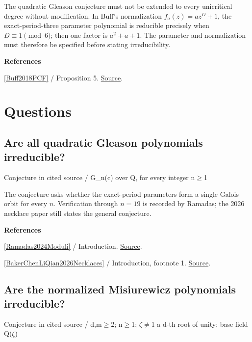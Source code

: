 \documentclass[11pt,a4paper,oneside,openany]{book}
\newenvironment{sources}{\par\smallskip\begingroup\footnotesize\color{atlasgray}\leftskip=10pt\setlength{\parskip}{2pt}}{\par\endgroup\smallskip}
\begin{document}
\color{black} The quadratic Gleason conjecture must not be extended to every unicritical degree without modification. In Buff's normalization \(f_a(z)=az^D+1\), the exact-period-three parameter polynomial is reducible precisely when \(D\equiv1\pmod6\); then one factor is \(a^2+a+1\). The parameter and normalization must therefore be specified before stating irreducibility.\par
\begin{sources}
\textbf{References}\par\smallskip
\noindent\hyperlink{ref:Buff2018PCF}{[Buff2018PCF]} / Proposition 5.  \href{https://nyjm.albany.edu/j/2018/24-54.html}{Source}.\par
\end{sources}\color{black}
\section*{Questions}
\subsection*{Are all quadratic Gleason polynomials irreducible?}
{\small\sffamily\color{atlasgold}Conjecture in cited source / G\_\allowbreak{}n(c) over Q, for every integer n\ensuremath{\ge}1}\par\smallskip
\color{black} The conjecture asks whether the exact-period parameters form a single Galois orbit for every \(n\). Verification through \(n=19\) is recorded by Ramadas; the 2026 necklace paper still states the general conjecture.\par
\begin{sources}
\textbf{References}\par\smallskip
\noindent\hyperlink{ref:Ramadas2024Moduli}{[Ramadas2024Moduli]} / Introduction.  \href{https://doi.org/10.1093/imrn/rnae126}{Source}.\par
\noindent\hyperlink{ref:BakerChenLiQian2026Necklaces}{[BakerChenLiQian2026Necklaces]} / Introduction, footnote 1.  \href{https://doi.org/10.1016/j.ejc.2026.104352}{Source}.\par
\end{sources}\color{black}
\subsection*{Are the normalized Misiurewicz polynomials irreducible?}
{\small\sffamily\color{atlasgold}Conjecture in cited source / d,m\ensuremath{\ge}2; n\ensuremath{\ge}1; \ensuremath{\zeta}\ensuremath{\ne}1 a d-th root of unity; base field Q(\ensuremath{\zeta})}\par\smallskip
\end{document}
